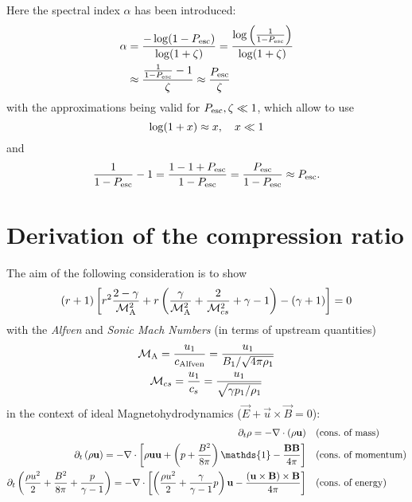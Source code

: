 Here the spectral index $\alpha$ has been introduced:
\begin{align*}
    \alpha&=\frac{-\log(1-P_{\mathrm{esc}})}{\log(1+\zeta)}
    =\frac{\log\left(\frac{1}{1-P_{\mathrm{esc}}}\right)}{\log(1+\zeta)}\\
    &\approx\frac{\frac{1}{1-P_{\mathrm{esc}}}-1}{\zeta}\approx\frac{P_{\mathrm{esc}}}{\zeta}
\end{align*}
with the approximations being valid for $P_{\mathrm{esc}},\zeta\ll1$, which allow to use
\begin{equation*}
    \log(1+x)\approx x\qc x\ll1
\end{equation*}
and
\begin{equation*}
    \frac{1}{1-P_{\mathrm{esc}}}-1=\frac{1-1+P_{\mathrm{esc}}}{1-P_{\mathrm{esc}}}=\frac{P_{\mathrm{esc}}}{1-P_{\mathrm{esc}}}\approx P_{\mathrm{esc}}.
\end{equation*}


\section{Derivation of the compression ratio}
\label{sec:app2}
The aim of the following consideration is to show
\begin{equation}
    (r+1)\left[r^2\frac{2-\gamma}{\mathcal{M}_{\mathrm{A}}^2}+r\left(\frac{\gamma}{\mathcal{M}_{\mathrm{A}}^2}+\frac{2}{\mathcal{M}_{cs}^2}+\gamma-1\right)-\left(\gamma+1\right)\right]=0
\end{equation}
with the \emph{Alfven} and \emph{Sonic Mach Numbers} (in terms of upstream
quantities)
\begin{gather}
    \mathcal{M}_{\mathrm{A}}=\frac{u_1}{c_{\mathrm{Alfven}}}=\frac{u_1}{B_1/\sqrt{4\pi\rho_1}}
    \label{eq:ma} \\
    \mathcal{M}_{cs}=\frac{u_1}{c_{s}}=\frac{u_1}{\sqrt{\gamma p_1/\rho_1}}
    \label{eq:ms}
\end{gather}
in the context of ideal Magnetohydrodynamics
($\vec{E}+\vec{u}\times\vec{B}=0$):
\begin{subequations}
\begin{align}
    \pt\rho=-\Div(\rho\vec{u}) & \quad\text{(cons.~of mass)} \\
    \pt\left(\rho\vec{u}\right)=-\Div \left[
        \rho\vec{u}\vec{u}+\left(p+\frac{B^2}{8\pi}\right)\mathds{1}-\frac{\vec{B}\vec{B}}{4\pi}\right]
    & \quad\text{(cons.~of momentum)} \\
    \pt\left(\frac{\rho{u^2}}{2}+\frac{B^2}{8\pi}+\frac{p}{\gamma-1}\right)
    =-\Div\left[\left(\frac{\rho{u^2}}{2}+\frac{\gamma}{\gamma-1}p\right)\vec{u}-\frac{\left(\vec{u}\times\vec{B}\right)\times\vec{B}}{4\pi}\right]
    & \quad\text{(cons.~of energy)}
\end{align}
\end{subequations}

